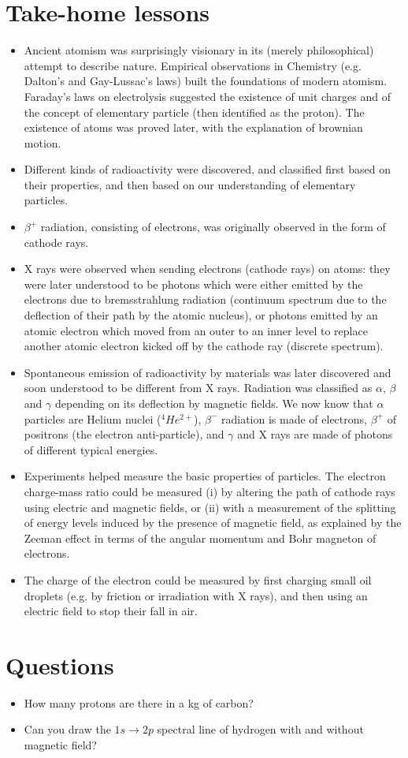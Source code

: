 \section*{Take-home lessons}
\begin{itemize}
    \item Ancient atomism was surprisingly visionary in its (merely philosophical) attempt to describe nature. Empirical observations in Chemistry (e.g. Dalton's and Gay-Lussac's laws) built the foundations of modern atomism. Faraday's laws on electrolysis suggested the existence of unit charges and of the concept of elementary particle (then identified as the proton). The existence of atoms was proved later, with the explanation of brownian motion.
    \item Different kinds of radioactivity were discovered, and classified first based on their properties, and then based on our understanding of elementary particles. 
    \item $\beta^+$ radiation, consisting of electrons, was originally observed in the form of cathode rays.
    \item X rays were observed when sending electrons (cathode rays) on atoms: they were later understood to be photons which were either emitted by the electrons due to bremsstrahlung radiation (continuum spectrum due to the deflection of their path by the atomic nucleus), or photons emitted by an atomic electron which moved from an outer to an inner  level to replace another atomic electron kicked off by the cathode ray (discrete spectrum).
    \item Spontaneous emission of radioactivity by materials was later discovered and soon understood to be different from X rays. Radiation was classified as $\alpha$, $\beta$ and $\gamma$ depending on its deflection by magnetic fields. We now know that $\alpha$ particles are Helium nuclei ($^4He^{2+}$), $\beta^-$ radiation is made of electrons, $\beta^+$ of positrons (the electron anti-particle), and $\gamma$ and X rays are made of photons of different typical energies.
    \item Experiments helped measure the basic properties of particles. The electron charge-mass ratio could be measured (i) by altering the path of cathode rays using electric and magnetic fields, or (ii) with a measurement of the splitting of energy levels induced by the presence of magnetic field, as explained by the Zeeman effect in terms of the angular momentum and Bohr magneton of electrons.
    \item The charge of the electron could be measured by first charging small oil droplets (e.g. by friction or irradiation with X rays), and then using an electric field to stop their fall in air. 
\end{itemize}
\section*{Questions}
\begin{itemize}
    \item How many protons are there in a \si{kg} of carbon?
    \item Can you draw the $1s\to2p$ spectral line of hydrogen with and without magnetic field?
\end{itemize}